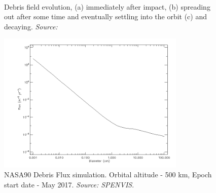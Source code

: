 \begin{figure}
  \centering
  \\
  \caption{Debris field evolution, (a) immediately after impact, (b) spreading out after some time and eventually settling into the orbit (c) and decaying. \emph{Source: \cite{constDesign}}}
  \label{fig:debris}
\end{figure}

\begin{figure}[!h]
\centering
\includegraphics[width=0.8\textwidth, angle=0]{chapters/img/debris.png}
\caption{NASA90 Debris Flux simulation. Orbital altitude - 500 km, Epoch start date - May 2017. \emph{Source: SPENVIS}.}
\label{fig:debrisModel}
\end{figure}

